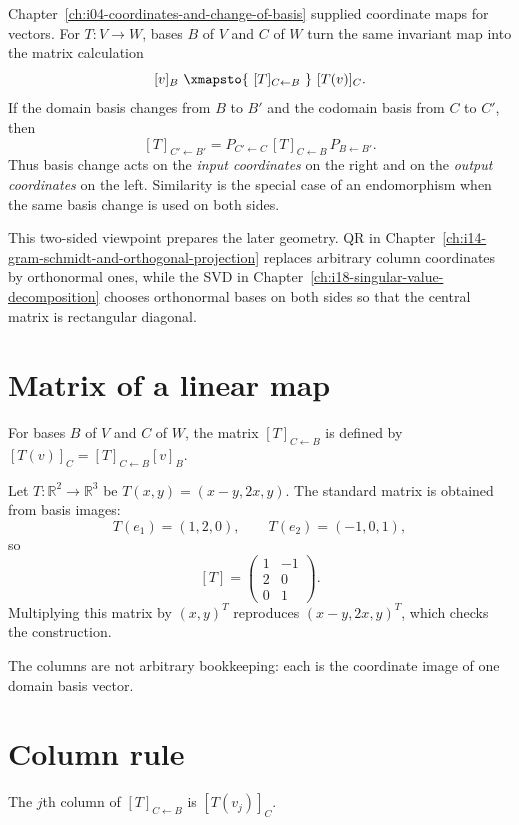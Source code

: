 \begin{remark}
Chapter~\ref{ch:i04-coordinates-and-change-of-basis} supplied coordinate maps
for vectors.  For \(T:V\to W\), bases \(B\) of \(V\) and \(C\) of \(W\)
turn the same invariant map into the matrix calculation
\[
[v]_B
\ \xmapsto{\ [T]_{C\leftarrow B}\ }\
[T(v)]_C.
\]
If the domain basis changes from \(B\) to \(B'\) and the codomain basis from
\(C\) to \(C'\), then
\[
[T]_{C'\leftarrow B'}
=
P_{C'\leftarrow C}\,
[T]_{C\leftarrow B}\,
P_{B\leftarrow B'}.
\]
Thus basis change acts on the \emph{input coordinates} on the right and on the
\emph{output coordinates} on the left.  Similarity is the special case of an
endomorphism when the same basis change is used on both sides.

This two-sided viewpoint prepares the later geometry.  QR in
Chapter~\ref{ch:i14-gram-schmidt-and-orthogonal-projection} replaces arbitrary
column coordinates by orthonormal ones, while the SVD in
Chapter~\ref{ch:i18-singular-value-decomposition} chooses orthonormal bases on
both sides so that the central matrix is rectangular diagonal.
\end{remark}

\section{Matrix of a linear map}
For bases $B$ of $V$ and $C$ of $W$, the matrix $[T]_{C\leftarrow B}$ is defined by $[T(v)]_C=[T]_{C\leftarrow B}[v]_B$.


\begin{example}\label{ex:i07-expand-01}
Let \(T:\mathbb R^2\to\mathbb R^3\) be
\(T(x,y)=(x-y,2x,y)\). The standard matrix is obtained from basis images:
\[
T(e_1)=(1,2,0),\qquad T(e_2)=(-1,0,1),
\]
so
\[
[T]=\begin{pmatrix}1&-1\\2&0\\0&1\end{pmatrix}.
\]
Multiplying this matrix by \((x,y)^T\) reproduces
\((x-y,2x,y)^T\), which checks the construction.

The columns are not arbitrary bookkeeping: each is the coordinate image of one
domain basis vector.
\end{example}
\section{Column rule}
The $j$th column of $[T]_{C\leftarrow B}$ is $[T(v_j)]_C$.

